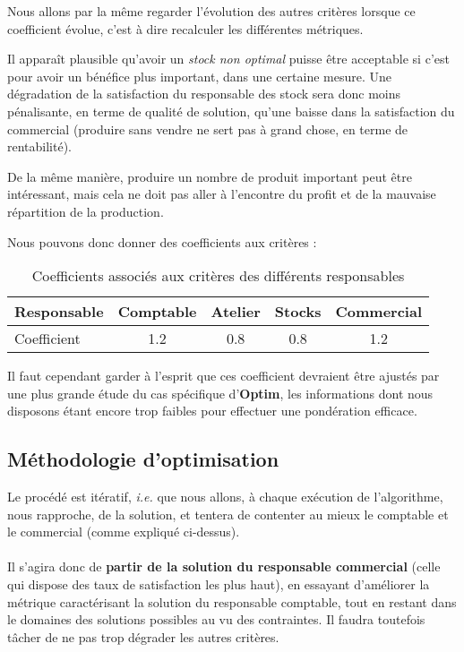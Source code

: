 Nous allons par la même regarder l'évolution des autres critères lorsque ce
coefficient évolue, c'est à dire recalculer les différentes métriques.

Il apparaît plausible qu'avoir un \emph{stock non optimal} puisse être acceptable
si c'est pour avoir un bénéfice plus important, dans une certaine mesure. Une
dégradation de la satisfaction du responsable des stock sera donc moins
pénalisante, en terme de qualité de solution, qu'une baisse dans la satisfaction
du commercial (produire sans vendre ne sert pas à grand chose, en terme de
rentabilité).

De la même manière, produire un nombre de produit important peut être
intéressant, mais cela ne doit pas aller à l'encontre du profit et de la
mauvaise répartition de la production.

Nous pouvons donc donner des coefficients aux critères :

\begin{table}[h!]
\begin{center}
\begin{tabular}{|l||c|c|c|c|}
\hline
    Responsable & Comptable & Atelier &  Stocks & Commercial  \\
	\hline
    Coefficient & 1.2	    & 0.8     & 0.8	& 1.2 \\
	\hline
	\end{tabular}
	\end{center}
\caption{Coefficients associés aux critères des différents responsables}
\end{table}

Il faut cependant garder à l'esprit que ces coefficient devraient être ajustés
par une plus grande étude du cas spécifique d'\textbf{Optim}, les informations
dont nous disposons étant encore trop faibles pour effectuer une pondération
efficace.

\subsection{Méthodologie d'optimisation}
Le procédé est itératif, \textsl{i.e.} que nous allons, à chaque exécution de l'algorithme, nous rapproche,
de la solution, et tentera de contenter au mieux le comptable et le
commercial (comme expliqué ci-dessus).\\
~\\			  
Il s'agira donc de \textbf{partir de la solution du responsable commercial}
(celle qui dispose des taux de satisfaction les plus
haut), en essayant d'améliorer la métrique caractérisant la solution du
responsable comptable, tout en restant dans le domaines des solutions possibles
au vu des contraintes. Il faudra toutefois tâcher de ne pas trop dégrader les
autres critères.

